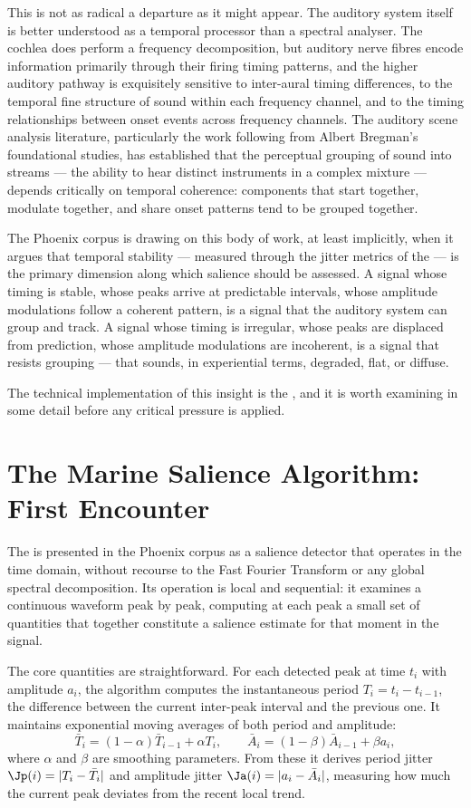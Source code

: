 This is not as radical a departure as it might appear. The auditory
system itself is better understood as a temporal processor than a
spectral analyser. The cochlea does perform a frequency decomposition,
but auditory nerve fibres encode information primarily through their
firing timing patterns, and the higher auditory pathway is exquisitely
sensitive to inter-aural timing differences, to the temporal fine
structure of sound within each frequency channel, and to the timing
relationships between onset events across frequency channels. The
auditory scene analysis literature, particularly the work following
from Albert Bregman's foundational studies, has established that
the perceptual grouping of sound into streams --- the ability to
hear distinct instruments in a complex mixture --- depends critically
on temporal coherence: components that start together, modulate
together, and share onset patterns tend to be grouped together.

The Phoenix corpus is drawing on this body of work, at least
implicitly, when it argues that temporal stability --- measured
through the jitter metrics of the \Marine{} --- is the primary
dimension along which salience should be assessed. A signal whose
timing is stable, whose peaks arrive at predictable intervals, whose
amplitude modulations follow a coherent pattern, is a signal that
the auditory system can group and track. A signal whose timing is
irregular, whose peaks are displaced from prediction, whose amplitude
modulations are incoherent, is a signal that resists grouping ---
that sounds, in experiential terms, degraded, flat, or diffuse.

The technical implementation of this insight is the \Marine{}, and
it is worth examining in some detail before any critical pressure is
applied.

\section{The Marine Salience Algorithm: First Encounter}
\label{sec:marine-first}

The \Marine{} is presented in the Phoenix corpus as a salience
detector that operates in the time domain, without recourse to the
Fast Fourier Transform or any global spectral decomposition. Its
operation is local and sequential: it examines a continuous
waveform peak by peak, computing at each peak a small set of
quantities that together constitute a salience estimate for that
moment in the signal.

The core quantities are straightforward. For each detected peak at
time $t_i$ with amplitude $a_i$, the algorithm computes the
instantaneous period $T_i = t_i - t_{i-1}$, the difference between
the current inter-peak interval and the previous one. It maintains
exponential moving averages of both period and amplitude:
\[
  \bar{T}_i = (1 - \alpha)\bar{T}_{i-1} + \alpha T_i, \qquad
  \bar{A}_i = (1 - \beta)\bar{A}_{i-1} + \beta a_i,
\]
where $\alpha$ and $\beta$ are smoothing parameters. From these
it derives period jitter $\Jp(i) = |T_i - \bar{T}_i|$ and
amplitude jitter $\Ja(i) = |a_i - \bar{A}_i|$, measuring how
much the current peak deviates from the recent local trend.

